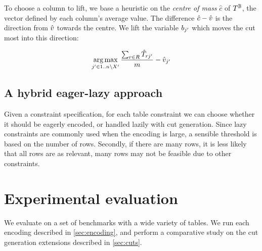 \documentclass[a4paper,UKenglish,cleveref,autoref,thm-restate]{lipics-v2021}
\begin{document}
To choose a column to lift, we base a heuristic on the \textit{centre of mass} $\hat{c}$ of $T^{\mathbb{B}}$, the vector defined by each column's average value.
The difference $\hat{c} - \hat{v}$ is the direction from $\hat{v}$ towards the centre.
We lift the variable $b_{j'}$ which moves the cut most into this direction:

\begin{equation}
\label{eq:com}
\operatorname*{arg\,max}_{j' \in 1..n \setminus X'}{\frac{\sum_{r \in R} \hat{T}_{rj'}}{m} - \hat{v}_{j'}}
\end{equation}

\subsection{A hybrid eager-lazy approach}
\label{sec:cuts:cutoff}
Given a constraint specification, for each table constraint we can choose whether it should be eagerly encoded, or handled lazily with cut generation.
Since lazy constraints are commonly used when the encoding is large, a sensible threshold is based on the number of rows.
Secondly, if there are many rows, it is less likely that all rows are as relevant, \eg many rows may not be feasible due to other constraints.

\section{Experimental evaluation}
\label{sec:exps}


We evaluate on a set of benchmarks with a wide variety of tables.
We run each encoding described in \cref{sec:encoding}, and perform a comparative study on the cut generation extensions described in \cref{sec:cuts}.
\end{document}
